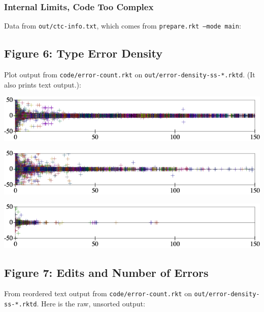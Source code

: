 \documentclass{article}
\begin{document}
\subsubsection*{Internal Limits, Code Too Complex}

Data from \texttt{out/ctc-info.txt}, which comes from
\texttt{prepare.rkt --mode main}:

{\footnotesize

}


\subsection*{Figure 6: Type Error Density}

Plot output from \texttt{code/error-count.rkt}
on \texttt{out/error-density-ss-*.rktd}.
(It also prints text output.):

\includegraphics[width=0.8\columnwidth]{out/error-count-nocheck-row--te-density-diff.png}

\includegraphics[width=0.8\columnwidth]{out/error-count-nonstrict-row--te-density-diff.png}

\includegraphics[width=0.8\columnwidth]{out/error-count-strict-row--te-density-diff.png}


\subsection*{Figure 7: Edits and Number of Errors}

From reordered text output from \texttt{code/error-count.rkt}
on \texttt{out/error-density-ss-*.rktd}.
Here is the raw, unsorted output:
\end{document}
